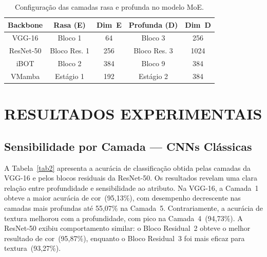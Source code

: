 \documentclass[letterpaper, 10 pt, conference]{ieeeconf}
\begin{document}
\begin{table}[htbp]
\caption{Configuração das camadas rasa e profunda no modelo MoE.}
\begin{center}
\begin{tabular}{c|c|c|c|c}
\hline
\textbf{Backbone} & \textbf{Rasa (E)} & \textbf{Dim~E}
                  & \textbf{Profunda (D)} & \textbf{Dim~D} \\
\hline
VGG-16     & Bloco 1      & 64   & Bloco 3      & 256  \\
ResNet-50  & Bloco Res. 1 & 256  & Bloco Res. 3 & 1024 \\
iBOT       & Bloco 2      & 384  & Bloco 9      & 384  \\
VMamba     & Estágio 1    & 192  & Estágio 2    & 384  \\
\hline
\end{tabular}
\label{tab_moe_config}
\end{center}
\end{table}

\section{RESULTADOS EXPERIMENTAIS}

\subsection{Sensibilidade por Camada — CNNs Clássicas}

A Tabela~\ref{tab2} apresenta a acurácia de classificação obtida pelas
camadas da VGG-16 e pelos blocos residuais da ResNet-50.
Os resultados revelam uma clara relação entre profundidade e sensibilidade
ao atributo.
Na VGG-16, a Camada~1 obteve a maior acurácia de cor~(95,13\%), com
desempenho decrescente nas camadas mais profundas até 55,07\% na Camada~5.
Contrariamente, a acurácia de textura melhorou com a profundidade, com
pico na Camada~4~(94,73\%).
A ResNet-50 exibiu comportamento similar: o Bloco Residual~2 obteve o
melhor resultado de cor~(95,87\%), enquanto o Bloco Residual~3 foi mais
eficaz para textura~(93,27\%).
\end{document}

